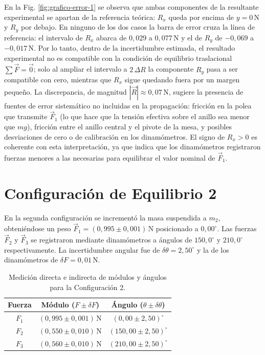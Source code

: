 \documentclass[12pt,a4paper]{article}
\begin{document}
En la Fig. \ref{fig:grafico-error-1} se observa que ambas componentes de la resultante experimental se apartan de la referencia teórica: $R_x$ queda por encima de $y = 0\,\mathrm{N}$ y $R_y$ por debajo. En ninguno de los dos casos la barra de error cruza la línea de referencia: el intervalo de $R_x$ abarca de $0{,}029$ a $0{,}077\,\mathrm{N}$ y el de $R_y$ de $-0{,}069$ a $-0{,}017\,\mathrm{N}$. Por lo tanto, dentro de la incertidumbre estimada, el resultado experimental no es compatible con la condición de equilibrio traslacional $\sum \vec{F} = \vec{0}$; solo al ampliar el intervalo a $2\,\Delta R$ la componente $R_y$ pasa a ser compatible con cero, mientras que $R_x$ sigue quedando fuera por un margen pequeño. La discrepancia, de magnitud $|\vec{R}| \approx 0{,}07\,\mathrm{N}$, sugiere la presencia de fuentes de error sistemático no incluidas en la propagación: fricción en la polea que transmite $\vec{F}_1$ (lo que hace que la tensión efectiva sobre el anillo sea menor que $mg$), fricción entre el anillo central y el pivote de la mesa, y posibles desviaciones de cero o de calibración en los dinamómetros. El signo de $R_x > 0$ es coherente con esta interpretación, ya que indica que los dinamómetros registraron fuerzas menores a las necesarias para equilibrar el valor nominal de $\vec{F}_1$.

\newpage



\section{Configuración de Equilibrio 2}

En la segunda configuración se incrementó la masa suspendida a $m_2$, obteniéndose un peso $\vec{F}_1 = (0{,}995 \pm 0{,}001)\,\mathrm{N}$ posicionado a $0{,}00^\circ$. Las fuerzas $\vec{F}_2$ y $\vec{F}_3$ se registraron mediante dinamómetros a ángulos de $150{,}0^\circ$ y $210{,}0^\circ$ respectivamente. La incertidumbre angular fue de $\delta\theta = 2{,}50^\circ$ y la de los dinamómetros de $\delta F = 0{,}01\,\mathrm{N}$.

\begin{table}[h!]
\centering
\begin{tabular}{|c|c|c|}
\hline
\textbf{Fuerza} & \textbf{Módulo ($F \pm \delta F$)} & \textbf{Ángulo ($\theta \pm \delta \theta$)} \\ \hline
$F_1$ & $(0{,}995 \pm 0{,}001)\,\mathrm{N}$ & $(0{,}00 \pm 2{,}50)^\circ$ \\ \hline
$F_2$ & $(0{,}550 \pm 0{,}010)\,\mathrm{N}$ & $(150{,}00 \pm 2{,}50)^\circ$ \\ \hline
$F_3$ & $(0{,}560 \pm 0{,}010)\,\mathrm{N}$ & $(210{,}00 \pm 2{,}50)^\circ$ \\ \hline
\end{tabular}
\caption{Medición directa e indirecta de módulos y ángulos para la Configuración 2.}
\label{tab:config2-mediciones}
\end{table}
\end{document}
